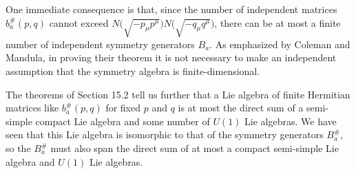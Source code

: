 One immediate consequence is that, since the number of independent matrices
$b_a^\#(p,q)$ cannot exceed
$N\bigl(\sqrt{-p_\mu p^\mu}\bigr)N\bigl(\sqrt{-q_\mu q^\mu}\bigr)$, there can
be at most a finite number of independent symmetry generators $B_a$. As
emphasized by Coleman and Mandula, in proving their theorem it is not necessary
to make an independent assumption that the symmetry algebra is
finite-dimensional.

The theorems of Section 15.2 tell us further that a Lie algebra of finite
Hermitian matrices like $b_a^\#(p,q)$ for fixed $p$ and $q$ is at most
the direct sum of a semi-simple compact Lie algebra and some number of $U(1)$
Lie algebras. We have seen that this Lie algebra is isomorphic to that of the
symmetry generators $B_a^\#$, so the $B_a^\#$ must also span the
direct sum of at most a compact semi-simple Lie algebra and $U(1)$ Lie
algebras.

